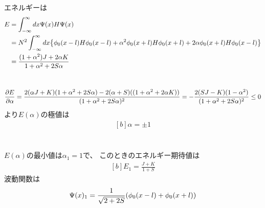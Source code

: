 \documentclass[../ap_2008.tex]{subfiles}
\begin{document}
\section{}
エネルギーは
\begin{equation}\begin{aligned}[b]
    E &= \int_{-\infty}^{\infty}dx \Psi(x)H\Psi(x)\\
    &= N^2\int_{-\infty}^{\infty}dx\qty{\phi_0(x-l)H\phi_0(x-l)+\alpha^2\phi_0(x+l)H\phi_0(x+l)+2\alpha\phi_0(x+l)H\phi_0(x-l)}\\
    &= \frac{(1+\alpha^2)J+2\alpha K}{1+\alpha^2+2S\alpha}
\end{aligned}\end{equation}

\section{}
\begin{equation}\begin{aligned}[b]
    \pdv{E}{\alpha}
    =\frac{2(\alpha J+K)(1+\alpha^2+2S\alpha)-2(\alpha + S)((1+\alpha^2+2\alpha K))}{(1+\alpha^2+2S\alpha)^2}
    = -\frac{2(SJ-K)(1-\alpha^2)}{(1+\alpha^2+2S\alpha)^2} \le 0
\end{aligned}\end{equation}
より\(E(\alpha)\)の極値は
\begin{equation}\begin{aligned}[b]
    \alpha = \pm 1
\end{aligned}\end{equation}

\section{}
\(E(\alpha)\)の最小値は\(\alpha_1=1\)で、
このときのエネルギー期待値は
\begin{equation}\begin{aligned}[b]
    E_1 = \frac{J+K}{1+S}
\end{aligned}\end{equation}
波動関数は
\begin{equation}\begin{aligned}[b]
    \Psi(x)_1=\frac{1}{\sqrt{2+2S}}\qty(\phi_0(x-l)+\phi_0(x+l))
\end{aligned}\end{equation}
\end{document}
